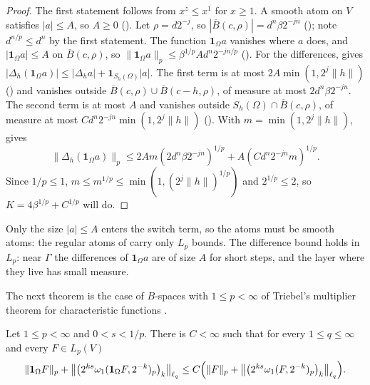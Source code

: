 \begin{proof}
\leanok
The first statement follows from $x^z \leq x^1$ for $x \geq 1$. A smooth atom on $V$ satisfies
$|a| \leq A$, so $A \geq 0$ (). Let $\rho = d 2^{-j}$, so
$|\overline B(c, \rho)| = d^n \beta 2^{-jn}$ (); note
$d^{n/p} \leq d^n$ by the first statement. The function $\mathbf 1_\Omega a$ vanishes where $a$
does, and $|\mathbf 1_\Omega a| \leq A$ on $\overline B(c, \rho)$, so
$\|\mathbf 1_\Omega a\|_p \leq \beta^{1/p} A d^n 2^{-jn/p}$ (). For the
differences,  gives
$|\Delta_h (\mathbf 1_\Omega a)| \leq |\Delta_h a| + \mathbf 1_{S_h(\Omega)} |a|$. The first term
is at most $2A \min(1, 2^j \|h\|)$ () and vanishes outside
$\overline B(c, \rho) \cup \overline B(c - h, \rho)$, of measure at most $2 d^n \beta 2^{-jn}$.
The second term is at most $A$ and vanishes outside $S_h(\Omega) \cap \overline B(c, \rho)$, of
measure at most $C d^n 2^{-jn} \min(1, 2^j \|h\|)$ (). With
$m = \min(1, 2^j \|h\|)$,  gives
\[
  \|\Delta_h (\mathbf 1_\Omega a)\|_p \leq 2A m (2 d^n \beta 2^{-jn})^{1/p}
  + A (C d^n 2^{-jn} m)^{1/p} .
\]
Since $1/p \leq 1$, $m \leq m^{1/p} \leq \min(1, (2^j \|h\|)^{1/p})$ and $2^{1/p} \leq 2$, so
$K = 4 \beta^{1/p} + C^{1/p}$ will do.
\end{proof}

Only the size $|a| \leq A$ enters the switch term, so the atoms must be smooth atoms: the regular
atoms of  carry only $L_p$ bounds. The difference bound holds in
$L_p$: near $\Gamma$ the differences of $\mathbf 1_\Omega a$ are of size $A$ for short steps, and
the layer where they live has small measure.

The next theorem is the case of $B$-spaces with $1 \leq p < \infty$ of Triebel's multiplier
theorem for characteristic functions \cite[Proposition 5.3 and Remark 5.4]{Triebel2002}.

\begin{theorem}
\label{thm:indicator-multiplier}
\leanok
{}
Let $1 \leq p < \infty$ and $0 < s < 1/p$. There is $C < \infty$ such that for every
$1 \leq q \leq \infty$ and every $F \in L_p(V)$
\[
  \|\mathbf 1_\Omega F\|_p
  + \bigl\|\bigl(2^{ks} \omega_1(\mathbf 1_\Omega F, 2^{-k})_p\bigr)_k\bigr\|_{\ell_q}
  \leq C \Bigl(\|F\|_p + \bigl\|\bigl(2^{ks} \omega_1(F, 2^{-k})_p\bigr)_k\bigr\|_{\ell_q}\Bigr) .
\]
\end{theorem}

